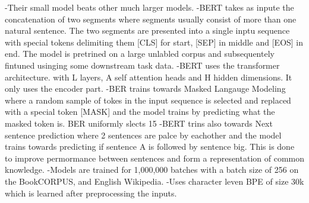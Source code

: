 -Their small model beats other much larger models. 
-BERT takes as inpute the concatenation of two segments where segments usually consist of more than one natural sentence. The two segments are presented into a single inptu sequence with special tokens delimiting them [CLS] for start, [SEP] in middle and [EOS] in end. The model is pretrined on a large unlabled corpus and subsequentely fintuned usinging some downstream task data. 
-BERT uses the transformer architecture. with L layers, A self attention heads and H hidden dimensions. It only uses the encoder part. 
-BER trains towards Masked Langauge Modeling where a random sample of tokes in the input sequence is selected and replaced with a special token [MASK] and the model trains by predicting what the masked token is. BER uniformly slects 15%
-BERT trins also towards Next sentence prediction where 2 sentences are palce by eachother and the model trains towards predicting if sentence A is followed by sentence big. This is done to improve permormance between sentences and form a representation of common knowledge. 
-Models are trained for 1,000,000 batches with a batch size of 256 on the BookCORPUS, and English Wikipedia. 
-Uses character leven BPE of size 30k which is learned after preprocessing the inputs.

